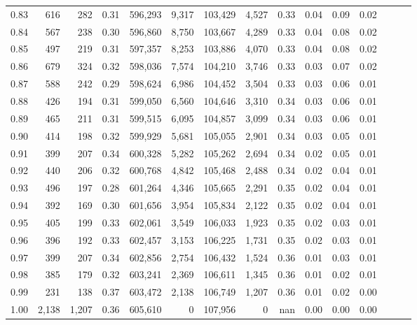 \begin{tabular}{rrrrrrrrrrrrrrr}
0.83 &     616 &    282 &  0.31 &  596,293 &    9,317 &  103,429 &    4,527 &  0.33 &  0.04 &  0.09 &      0.02 \\
0.84 &     567 &    238 &  0.30 &  596,860 &    8,750 &  103,667 &    4,289 &  0.33 &  0.04 &  0.08 &      0.02 \\
0.85 &     497 &    219 &  0.31 &  597,357 &    8,253 &  103,886 &    4,070 &  0.33 &  0.04 &  0.08 &      0.02 \\
0.86 &     679 &    324 &  0.32 &  598,036 &    7,574 &  104,210 &    3,746 &  0.33 &  0.03 &  0.07 &      0.02 \\
0.87 &     588 &    242 &  0.29 &  598,624 &    6,986 &  104,452 &    3,504 &  0.33 &  0.03 &  0.06 &      0.01 \\
0.88 &     426 &    194 &  0.31 &  599,050 &    6,560 &  104,646 &    3,310 &  0.34 &  0.03 &  0.06 &      0.01 \\
0.89 &     465 &    211 &  0.31 &  599,515 &    6,095 &  104,857 &    3,099 &  0.34 &  0.03 &  0.06 &      0.01 \\
0.90 &     414 &    198 &  0.32 &  599,929 &    5,681 &  105,055 &    2,901 &  0.34 &  0.03 &  0.05 &      0.01 \\
0.91 &     399 &    207 &  0.34 &  600,328 &    5,282 &  105,262 &    2,694 &  0.34 &  0.02 &  0.05 &      0.01 \\
0.92 &     440 &    206 &  0.32 &  600,768 &    4,842 &  105,468 &    2,488 &  0.34 &  0.02 &  0.04 &      0.01 \\
0.93 &     496 &    197 &  0.28 &  601,264 &    4,346 &  105,665 &    2,291 &  0.35 &  0.02 &  0.04 &      0.01 \\
0.94 &     392 &    169 &  0.30 &  601,656 &    3,954 &  105,834 &    2,122 &  0.35 &  0.02 &  0.04 &      0.01 \\
0.95 &     405 &    199 &  0.33 &  602,061 &    3,549 &  106,033 &    1,923 &  0.35 &  0.02 &  0.03 &      0.01 \\
0.96 &     396 &    192 &  0.33 &  602,457 &    3,153 &  106,225 &    1,731 &  0.35 &  0.02 &  0.03 &      0.01 \\
0.97 &     399 &    207 &  0.34 &  602,856 &    2,754 &  106,432 &    1,524 &  0.36 &  0.01 &  0.03 &      0.01 \\
0.98 &     385 &    179 &  0.32 &  603,241 &    2,369 &  106,611 &    1,345 &  0.36 &  0.01 &  0.02 &      0.01 \\
0.99 &     231 &    138 &  0.37 &  603,472 &    2,138 &  106,749 &    1,207 &  0.36 &  0.01 &  0.02 &      0.00 \\
1.00 &   2,138 &  1,207 &  0.36 &  605,610 &        0 &  107,956 &        0 &   nan &  0.00 &  0.00 &      0.00 \\
\bottomrule
\end{tabular}
